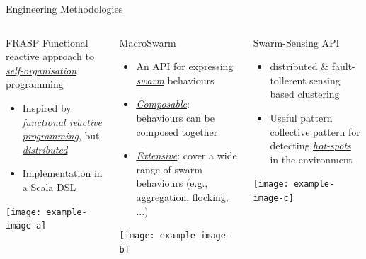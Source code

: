 \documentclass[presentation, 9pt, aspectratio=169]{beamer}\mode<presentation>{\usetheme{AMSBolognaFC}}
\begin{document}
\begin{frame}{Engineering Methodologies}
\vspace{-0.5cm}
\begin{columns}[t]
\begin{column}{0.31\textwidth}
\begin{exampleblock}{FRASP}
\footnotesize{
  Functional reactive approach to \emph{\underline{self-organisation}} programming
}
\begin{itemize}
  \item Inspired by \emph{\underline{functional reactive programming}}, but \emph{\underline{distributed}}
  \item Implementation in a Scala DSL
\end{itemize}
\texttt{[image: example-image-a]}
\end{exampleblock}
\end{column}
\begin{column}{0.31\textwidth}
\begin{exampleblock}{MacroSwarm}
\footnotesize{
  \begin{itemize}
  \item An API for expressing \underline{\emph{swarm}} behaviours
  \item \emph{\underline{Composable}}: behaviours can be composed together
  \item \emph{\underline{Extensive}}: cover a wide range of swarm behaviours (e.g., aggregation, flocking, ...)
\end{itemize}
}
\texttt{[image: example-image-b]}
\end{exampleblock}
\end{column}
\begin{column}{0.31\textwidth}
\footnotesize{
\begin{exampleblock}{Swarm-Sensing API}
  \begin{itemize}
    \item distributed \& fault-tollerent sensing based clustering
    \item Useful pattern collective pattern for detecting \emph{\underline{hot-spots}} in the environment
  \end{itemize}
  \texttt{[image: example-image-c]}
\end{exampleblock}

}  
\end{column}
\end{columns}

\end{frame}
\end{document}
